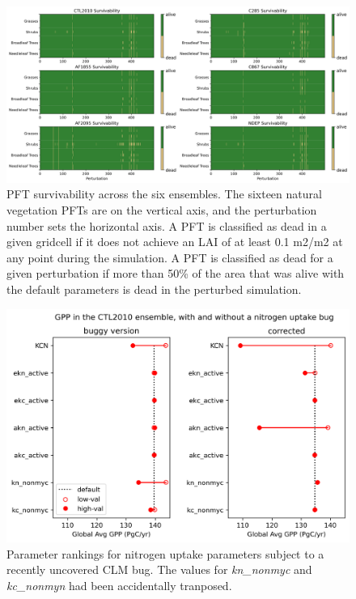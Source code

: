 \documentclass[11pt]{article}
\begin{document}
\begin{landscape}
\begin{figure}[h]
\centering
\includegraphics[width=50pc]{../figs/supp/survivability.png}
\caption{PFT survivability across the six ensembles. The sixteen natural vegetation PFTs are on the vertical axis, and the perturbation number sets the horizontal axis. A PFT is classified as dead in a given gridcell if it does not achieve an LAI of at least 0.1 m2/m2 at any point during the simulation. A PFT is classified as dead for a given perturbation if more than 50\% of the area that was alive with the default parameters is dead in the perturbed simulation.}
\label{supp:surv}
\end{figure}
\end{landscape}

\begin{figure}[h]
\centering
\includegraphics[width=\textwidth]{../figs/supp/funbug.png}
\caption{Parameter rankings for nitrogen uptake parameters subject to a recently uncovered CLM bug. The values for \textit{kn\_nonmyc} and \textit{kc\_nonmyn} had been accidentally tranposed.}
\label{supp:funbug}
\end{figure}
\end{document}
